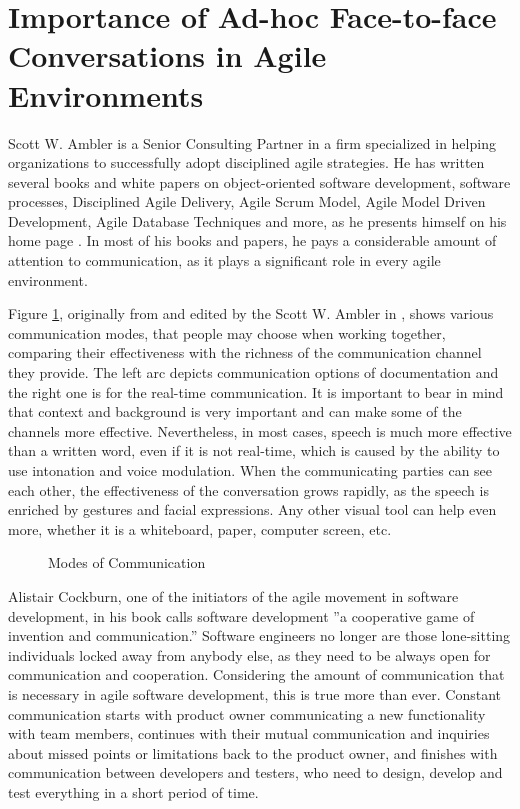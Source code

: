 \documentclass[11pt,singleside]{myfithesis2}
\newcommand{\pict}[4]{
	\begin{figure}[h!]
  		\vspace{-7px}
  		\centerline{\fcolorbox{darkgray}{palegray}{\texttt{[image: \#2]}}}
  		\caption{#1}
  		\label{#4}
	\end{figure}
}
\begin{document}
	\section{Importance of Ad-hoc Face-to-face Conversations in Agile Environments}\label{commImportance}
Scott W. Ambler is a Senior Consulting Partner in a firm specialized in helping organizations to successfully adopt disciplined agile strategies. He has written several books and white papers on object-oriented software development, software processes, Disciplined Agile Delivery, Agile Scrum Model, Agile Model Driven Development, Agile Database Techniques and more, as he presents himself on his home page \cite{ambler}. In most of his books and papers, he pays a considerable amount of attention to communication, as it plays a significant role in every agile environment. 
	
Figure \ref{pic:commModes}, originally from \cite{agileCockburn} and edited by the Scott W. Ambler in \cite{roninInt}, shows various communication modes, that people may choose when working together, comparing their effectiveness with the richness of the communication channel they provide. The left arc depicts communication options of documentation and the right one is for the real-time communication. It is important to bear in mind that context and background is very important and can make some of the channels more effective. Nevertheless, in most cases, speech is much more effective than a written word, even if it is not real-time, which is caused by the ability to use intonation and voice modulation. When the communicating parties can see each other, the effectiveness of the conversation grows rapidly, as the speech is enriched by gestures and facial expressions. Any other visual tool can help even more, whether it is a whiteboard, paper, computer screen, etc.

\pict{Modes of Communication \cite{roninInt}}{data/communicationModes.png}{width=0.8\textwidth}{pic:commModes}

Alistair Cockburn, one of the initiators of the agile movement in software development, in his book \cite{commCockburn} calls software development ''a cooperative game of invention and communication.'' Software engineers no longer are those lone-sitting individuals locked away from anybody else, as they need to be always open for communication and cooperation. Considering the amount of communication that is necessary in agile software development, this is true more than ever. Constant communication starts with product owner communicating a new functionality with team members, continues with their mutual communication and inquiries about missed points or limitations back to the product owner, and finishes with communication between developers and testers, who need to design, develop and test everything in a short period of time. 
\end{document}
